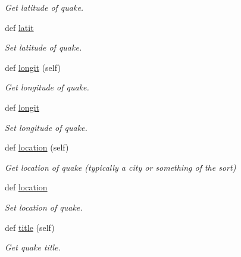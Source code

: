 \begin{DoxyCompactItemize}
\begin{DoxyCompactList}\small\item\em Get latitude of quake. \end{DoxyCompactList}\item 
def \hyperlink{classbridges_1_1data__src__dependent_1_1earthquake__usgs_1_1_earthquake_u_s_g_s_aff234b9c32bedb8dc8e339de82dc46ef}{latit}
\begin{DoxyCompactList}\small\item\em Set latitude of quake. \end{DoxyCompactList}\item 
def \hyperlink{classbridges_1_1data__src__dependent_1_1earthquake__usgs_1_1_earthquake_u_s_g_s_a98a8f3ee07d05b57c5028b2bad8be9bf}{longit} (self)
\begin{DoxyCompactList}\small\item\em Get longitude of quake. \end{DoxyCompactList}\item 
def \hyperlink{classbridges_1_1data__src__dependent_1_1earthquake__usgs_1_1_earthquake_u_s_g_s_afbd9e47192dbf4b27f694297b83697c6}{longit}
\begin{DoxyCompactList}\small\item\em Set longitude of quake. \end{DoxyCompactList}\item 
def \hyperlink{classbridges_1_1data__src__dependent_1_1earthquake__usgs_1_1_earthquake_u_s_g_s_a3b8f61c92ee3c13d3cd54bc264378882}{location} (self)
\begin{DoxyCompactList}\small\item\em Get location of quake (typically a city or something of the sort) \end{DoxyCompactList}\item 
def \hyperlink{classbridges_1_1data__src__dependent_1_1earthquake__usgs_1_1_earthquake_u_s_g_s_a3004af322cb3d2179f17ce0210571c22}{location}
\begin{DoxyCompactList}\small\item\em Set location of quake. \end{DoxyCompactList}\item 
def \hyperlink{classbridges_1_1data__src__dependent_1_1earthquake__usgs_1_1_earthquake_u_s_g_s_a7b46d73e199b4cf4f9b1253f89727abe}{title} (self)
\begin{DoxyCompactList}\small\item\em Get quake title. \end{DoxyCompactList}\item 

\end{DoxyCompactItemize}
